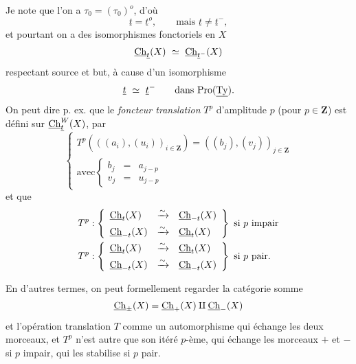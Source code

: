 Je note que l'on a $\tau_0 = (\tau_0)^o$, d'où
\[
\underline{t} = \underline{t}^o, \qquad \text{mais } \underline{t} \neq \underline{t}^-,
\]
et pourtant on a des isomorphismes fonctoriels en $X$
\[
\underline{\mathrm{Ch}}_{\underline{t}}(X) \ \simeq \ \underline{\mathrm{Ch}}_{\underline{t}^-}(X)
\]
respectant source et but, à cause d'un isomorphisme
\[
\underline{t} \ \simeq \ \underline{t}^- \qquad \text{dans Pro}(\underline{\mathrm{Ty}}).
\]
On peut dire p. ex. que le \textit{foncteur translation} $T^p$ d'amplitude $p$ (pour $p \in \mathbf{Z}$) est défini sur $\underline{\mathrm{Ch}}^{W}_{\underline{t}}(X)$, par
\[
\left\{ \begin{array}{l}
T^p(((a_i),(u_i))_{i \in \mathbf{Z}}) = ((b_j),(v_j))_{j \in \mathbf{Z}} \\[1ex]
\text{avec} \left\{ \begin{array}{lcl} b_j & = & a_{j-p} \\[1ex] v_j & = & u_{j-p} \end{array} \right.
\end{array} \right.
\]
et que
\[
\begin{aligned}
T^p &: \left\{ \begin{array}{lcl} \Ch_{t}(X) & \xrightarrow{\sim} & \Ch_{-t}(X) \\[1ex] \Ch_{-t}(X) & \xrightarrow{\sim} & \Ch_{t}(X) \end{array} \right\} \ \text{si } p \text{ impair} \\
T^p &: \left\{ \begin{array}{lcl} \Ch_{t}(X) & \xrightarrow{\sim} & \Ch_{t}(X) \\[1ex] \Ch_{-t}(X) & \xrightarrow{\sim} & \Ch_{-t}(X) \end{array} \right\} \ \text{si } p \text{ pair.}
\end{aligned} %
\]

En d'autres termes, on peut formellement regarder la catégorie somme
\[
\underline{\mathrm{Ch}}_{\pm}(X) = \underline{\mathrm{Ch}}_{+}(X) \amalg \underline{\mathrm{Ch}}_{-}(X)
\]
et l'opération translation $T$ comme un automorphisme qui échange les deux morceaux, et $T^p$ n'est autre que son itéré $p$-ème, qui échange les morceaux $+$ et $-$ si $p$ impair, qui les stabilise si $p$ pair.


